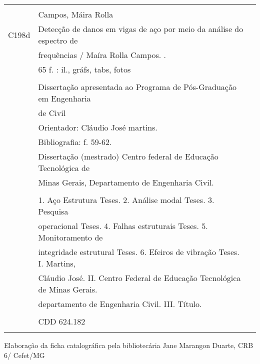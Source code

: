\newpage \normalsize
\thispagestyle{empty}

\vspace*{6cm}
\begin{center}



\vspace{1 in}
\begin{spacing}{1.0}
\begin{tabular}{|clc|} \hline

  \hspace{0.5cm} & & \\
  & Campos, Máira Rolla & \\
  C198d & \hspace{0.15in} Detecção de danos em vigas de aço por meio da análise do espectro de & \\
  & frequências / Maíra Rolla Campos. \- 2020. & \\
  & \hspace{0.15in} 65 f. : il., gráfs, tabs, fotos & \\
  & & \\ 
  & \hspace{0.15in} Dissertação apresentada ao Programa de Pós-Graduação em Engenharia & \\
  & de Civil & \\
  & \hspace{0.15in} Orientador: Cláudio José martins. & \\
  & \hspace{0.15in} Bibliografia: f. 59-62. & \\
  & \hspace{0.15in} Dissertação (mestrado) \- Centro federal de Educação Tecnológica de &\\
  & Minas Gerais, Departamento de Engenharia Civil. & \\
  & & \\
  & \hspace{0.15in} 1. Aço \- Estrutura \- Teses. 2. Análise modal \- Teses. 3. Pesquisa & \\
  & operacional \- Teses. 4. Falhas estruturais \- Teses. 5. Monitoramento de & \\
  & integridade estrutural \- Teses. 6. Efeiros de vibração \- Teses. I. Martins, & \\
  & Cláudio José. II. Centro Federal de Educação Tecnológica de Minas Gerais. & \\
  & departamento de Engenharia Civil. III. Título. & \\
  & & \\ 
  & CDD 624.182 & \\
  & & \\ \hline
\end{tabular}
\end{spacing}
\end{center}
\vspace{-0.4 cm}

\noindent Elaboração da ficha catalográfica pela bibliotecária Jane Marangon Duarte, CRB 6/ Cefet/MG






